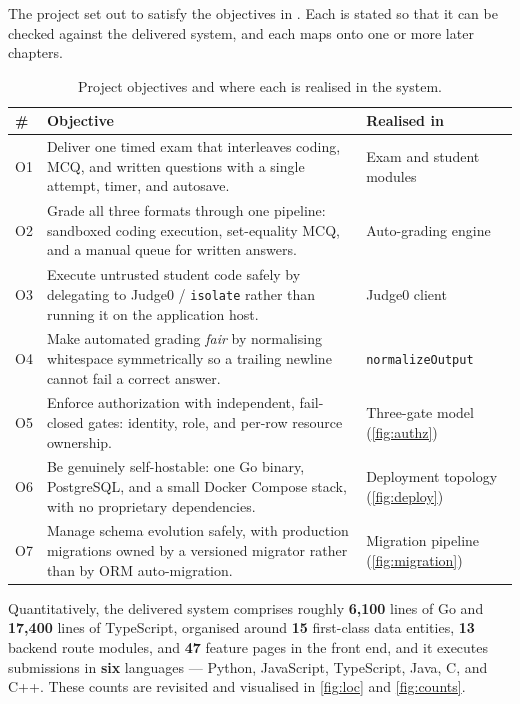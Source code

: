 The project set out to satisfy the objectives in
. Each is stated so that it can be checked against the
delivered system, and each maps onto one or more later chapters.

\begin{table}[htbp]
\centering
\caption{Project objectives and where each is realised in the system.}
\label{tab:objectives}
\begin{tabularx}{\linewidth}{@{}L{0.6cm}X L{2.5cm}@{}}
\toprule
\textbf{\#} & \textbf{Objective} & \textbf{Realised in} \\
\midrule
O1 & Deliver one timed exam that interleaves coding, MCQ, and written
questions with a single attempt, timer, and autosave. & Exam and student
modules \\
O2 & Grade all three formats through one pipeline: sandboxed coding execution,
set-equality MCQ, and a manual queue for written answers. & Auto-grading
engine \\
O3 & Execute untrusted student code safely by delegating to Judge0 /
\texttt{isolate} rather than running it on the application host. & Judge0
client \\
O4 & Make automated grading \emph{fair} by normalising whitespace symmetrically
so a trailing newline cannot fail a correct answer. & \texttt{normalizeOutput}
\\
O5 & Enforce authorization with independent, fail-closed gates: identity,
role, and per-row resource ownership. & Three-gate model
(\cref{fig:authz}) \\
O6 & Be genuinely self-hostable: one Go binary, PostgreSQL, and a small Docker
Compose stack, with no proprietary dependencies. & Deployment topology
(\cref{fig:deploy}) \\
O7 & Manage schema evolution safely, with production migrations owned by a
versioned migrator rather than by ORM auto-migration. & Migration pipeline
(\cref{fig:migration}) \\
\bottomrule
\end{tabularx}
\end{table}

Quantitatively, the delivered system comprises roughly \textbf{6{,}100} lines
of Go and \textbf{17{,}400} lines of TypeScript, organised around
\textbf{15} first-class data entities, \textbf{13} backend route modules, and
\textbf{47} feature pages in the front end, and it executes submissions in
\textbf{six} languages --- Python, JavaScript, TypeScript, Java, C, and C++.
These counts are revisited and visualised in \cref{fig:loc} and
\cref{fig:counts}.

